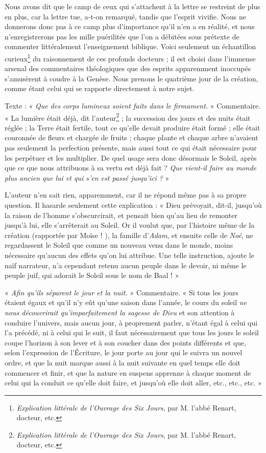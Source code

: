 \documentclass[a4paper, 11pt, oneside]{article}
\begin{document}
Nous avons dit que le camp de ceux qui s'attachent à la lettre se restreint de plus en plus, car la lettre tue, a-t-on remarqué, tandis que l'esprit vivifie. Nous ne donnerons donc pas à ce camp plus d'importance qu'il n'en a en réalité, et nous n'enregistrerons pas les mille puérilités que l'on a débitées sous prétexte de commenter littéralement l'enseignement biblique. Voici seulement un échantillon curieux\footnote{\emph{Explication littérale de l'Ouvrage des Six Jours}, par M. l'abbé Renart, docteur, etc.} du raisonnement de ces profonds docteurs ; il est choisi dans l'immense arsenal des commentaires théologiques que des esprits apparemment inoccupés s'amusèrent à coudre à la Genèse. Nous prenons le quatrième jour de la création, comme étant celui qui se rapporte directement à notre sujet.

Texte : « \emph{Que des corps lumineux soient faits dans le firmament.} » Commentaire. « La lumière était déjà, dit l'auteur\footnote{\emph{Explication littérale de l'Ouvrage des Six Jours}, par M. l'abbé Renart, docteur, etc.} ; la succession des jours et des nuits était réglée ; la Terre était fertile, tout ce qu'elle devait produire était formé ; elle était couronnée de fleurs et chargée de fruits ; chaque plante et chaque arbre n'avaient pas seulement la perfection présente, mais aussi tout ce qui était nécessaire pour les perpétuer et les multiplier. De quel usage sera donc désormais le Soleil, après que ce que nous attribuons à sa vertu est déjà fait ? \emph{Que vient-il faire au monde plus ancien que lui et qui s'en est passé jusqu'ici ?} »

L'auteur n'en sait rien, apparemment, car il ne répond même pas à sa propre question. Il hasarde seulement cette explication : « Dieu prévoyait, dit-il, jusqu'où la raison de l'homme s'obscurcirait, et pensait bien qu'au lieu de remonter jusqu'à lui, elle s'arrêterait au Soleil. Or il voulut que, par l'histoire même de la création (rapportée par Moïse ! ), la famille d'\emph{Adam}, et ensuite celle de \emph{Noé}, ne regardassent le Soleil que comme un nouveau venu dans le monde, moins nécessaire qu'aucun des effets qu'on lui attribue. Une telle instruction, ajoute le naïf narrateur, n'a cependant retenu aucun peuple dans le devoir, ni même le peuple juif, qui adorait le Soleil sous le nom de Baal ! »

« \emph{Afin qu'ils séparent le jour et la nuit.} » Commentaire. « Si tous les jours étaient égaux et qu'il n'y eût qu'une saison dans l'année, le cours du soleil \emph{ne nous découvrirait qu'imparfaitement la sagesse de Dieu} et son attention à conduire l'univers, mais aucun jour, à proprement parler, n'étant égal à celui qui l'a précédé, ni à celui qui le suit, il faut nécessairement que tous les jours le soleil coupe l'horizon à son lever et à son coucher dans des points différents et que, selon l'expression de l'Écriture, le jour porte au jour qui le suivra un nouvel ordre, et que la nuit marque aussi à la nuit suivante en quel temps elle doit commencer et finir, et que la nature en suspens apprenne à chaque moment de celui qui la conduit ce qu'elle doit faire, et jusqu'où elle doit aller, etc., etc., etc. »
\end{document}
